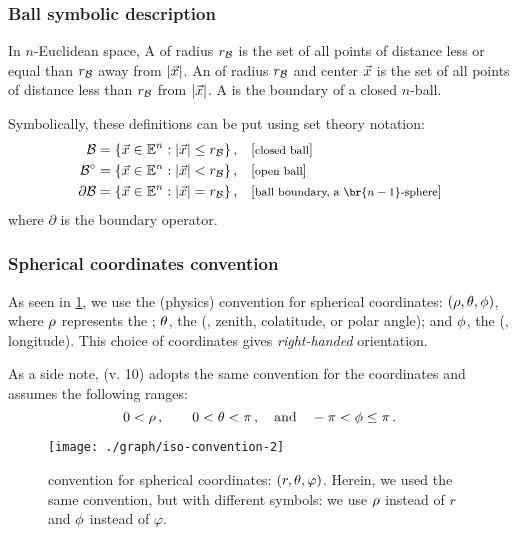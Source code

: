 \subsubsection{Ball symbolic description}
%
In $n$-Euclidean space, A  of radius $r_{\mathcal{B}}$ is the set of all points of distance less or equal than $r_{\mathcal{B}}$ away from $\norm{\vec\pos}$. An  of radius $r_{\mathcal{B}}$ and center $\vec{x}$ is the set of all points of distance less than $r_{\mathcal{B}}$ from $\norm{\vec\pos}$. A  is the boundary of a closed $n$-ball.

Symbolically, these definitions can be put using set theory notation:
%
\begin{align*}
  \cregion\ball &= \setprop{\vec\pos\in\nespace n}{\norm{\vec\pos}\leq\rball}\,, && \eqtxt{closed ball} \\
  \oregion\ball &= \setprop{\vec\pos\in\nespace n}{\norm{\vec\pos} <  \rball}\,, && \eqtxt{open ball}   \\
  \bregion\ball &= \setprop{\vec\pos\in\nespace n}{\norm{\vec\pos} = \rball}\,, && \eqtxt{ball boundary, a $\br{n-1}$-sphere}
\end{align*}
%
where $\partial$ is the boundary operator.


\subsubsection{Spherical coordinates convention}
%
As seen in \cref{fig:isoconventionsphericalcoordinates}, we use the  (physics) convention for spherical coordinates: $\tuple{\sxpos,\sypos,\szpos}$, where $\rho$ represents the ; $\theta$, the  (\aka, zenith, colatitude, or polar angle); and $\phi$, the  (\aka, longitude). This choice of coordinates gives \emph{right-handed} orientation.

As a side note,  (v. 10) adopts the same convention for the coordinates and assumes the following ranges:
%
\begin{equation*}
  0 < \rho\,,\qquad
  0 < \theta < \pi\,,\quad\text{and}\quad
  -\pi < \phi\leq\pi\,.
\end{equation*}

\begin{figure}[b]
  \capstart\centering
  \texttt{[image: ./graph/iso-convention-2]}
  \caption{ convention for spherical coordinates: $\tuple{r,\theta,\varphi}$. Herein, we used the same convention, but with different symbols: we use $\rho$ instead of $r$ and $\phi$ instead of $\varphi$.}
  \label{fig:isoconventionsphericalcoordinates}
\end{figure}
